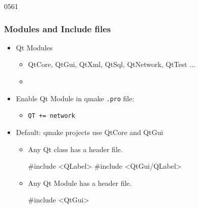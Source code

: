 \begin{slide}[fragile]{0561}
  \frametitle{Modules and Include files}
  \begin{itemize}
  \item Qt Modules
    \begin{itemize}
    \item  QtCore, QtGui, QtXml, QtSql, QtNetwork, QtTest ...
    \item[] 
    \end{itemize}
  \item Enable Qt Module in qmake \texttt{.pro} file: 
    \begin{itemize}
    \item  \verb!QT += network!
    \end{itemize}
  \item Default: qmake projects use QtCore and QtGui
    \begin{itemize}
    \item Any Qt class has a header file.
  \begin{cpp}
#include <QLabel>
#include <QtGui/QLabel>
  \end{cpp}
    \item Any Qt Module has a header file.
  \begin{cpp}
#include <QtGui>
  \end{cpp}
    \end{itemize} 
  \end{itemize}
\end{slide}

